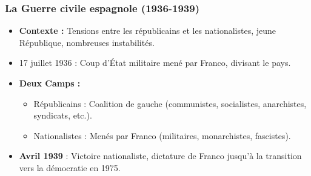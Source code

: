 \documentclass[xcolor=dvipsnames, aspectratio=169]{beamer}
\begin{document}
\begin{frame}
  \frametitle{La Guerre civile espagnole (1936-1939)}
  \footnotesize
  \begin{itemize}
    \item \textbf{Contexte :} Tensions entre les républicains et les nationalistes, jeune République, nombreuses instabilités.
    \vspace{0.1in}
    \item 17 juillet 1936 : Coup d'État militaire mené par Franco, divisant le pays.
    \vspace{0.1in}
    \item \textbf{Deux Camps :} 
      \begin{itemize}
        \item Républicains : Coalition de gauche (communistes, socialistes, anarchistes, syndicats, etc.).
        \item Nationalistes : Menés par Franco (militaires, monarchistes, fascistes).
      \end{itemize}
      \vspace{0.1in}
    \item \textbf{Avril 1939} : Victoire nationaliste, dictature de Franco jusqu'à la transition vers la démocratie en 1975.
  \end{itemize}
\end{frame}
\end{document}
